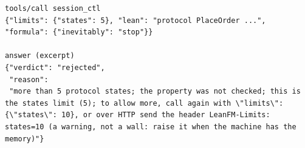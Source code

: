\begin{lstlisting}[language={},basicstyle=\ttfamily\footnotesize,breaklines=true]
tools/call session_ctl
{"limits": {"states": 5}, "lean": "protocol PlaceOrder ...", "formula": {"inevitably": "stop"}}

answer (excerpt)
{"verdict": "rejected",
 "reason":
 "more than 5 protocol states; the property was not checked; this is the states limit (5); to allow more, call again with \"limits\": {\"states\": 10}, or over HTTP send the header LeanFM-Limits: states=10 (a warning, not a wall: raise it when the machine has the memory)"}
\end{lstlisting}
